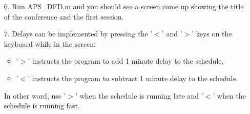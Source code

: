 \documentclass[12pt]{article}
\begin{document}
\begin{itemize}
 \item[6.]  Run APS\_DFD.m and you should see a screen come up showing the title of the conference and the first session.

 \item[7.]  Delays can be implemented by pressing the '$<$' and '$>$' keys on the keyboard while in the screen:
   \begin{itemize}
    \item '$>$' instructs the program to add 1 minute delay to the schedule,
    \item '$<$' instructs the program to subtract 1 minute delay to the schedule.
   \end{itemize}
   In other word, use '$>$' when the schedule is running late and '$<$' when the schedule is running fast.


\end{itemize}



\parskip -0.1in
\end{document}
